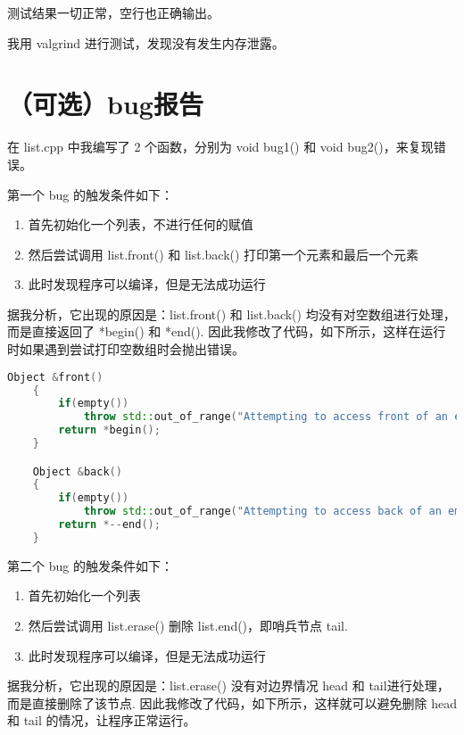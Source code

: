 \documentclass[UTF8]{ctexart}
\begin{document}
测试结果一切正常，空行也正确输出。

我用 valgrind 进行测试，发现没有发生内存泄露。


\section{（可选）bug报告}

在 list.cpp 中我编写了 2 个函数，分别为 void bug1() 和 void bug2()，来复现错误。

第一个 bug 的触发条件如下：

\begin{enumerate}
    \item 首先初始化一个列表，不进行任何的赋值
    \item 然后尝试调用 list.front() 和 list.back() 打印第一个元素和最后一个元素
    \item 此时发现程序可以编译，但是无法成功运行
\end{enumerate}

据我分析，它出现的原因是：list.front() 和 list.back() 均没有对空数组进行处理，
而是直接返回了 *begin() 和 *\-\-end(). 因此我修改了代码，如下所示，这样在运行时如果遇到尝试打印空数组时会抛出错误。

\begin{lstlisting}[language=c++, breaklines=true, keywordstyle=\color{blue!70}, commentstyle=\color{red!50!green!50!blue!50}, frame=shadowbox, rulesepcolor=\color{red!20!green!20!blue!20}]
    Object &front()
    {
        if(empty())
            throw std::out_of_range("Attempting to access front of an empty list");
        return *begin(); 
    }

    Object &back()
    {
        if(empty())
            throw std::out_of_range("Attempting to access back of an empty list");
        return *--end();
    }
\end{lstlisting}

第二个 bug 的触发条件如下：

\begin{enumerate}
    \item 首先初始化一个列表
    \item 然后尝试调用 list.erase() 删除 list.end()，即哨兵节点 tail. 
    \item 此时发现程序可以编译，但是无法成功运行
\end{enumerate}

据我分析，它出现的原因是：list.erase() 没有对边界情况 head 和 tail进行处理，
而是直接删除了该节点. 因此我修改了代码，如下所示，这样就可以避免删除 head 和 tail 的情况，让程序正常运行。
\end{document}
